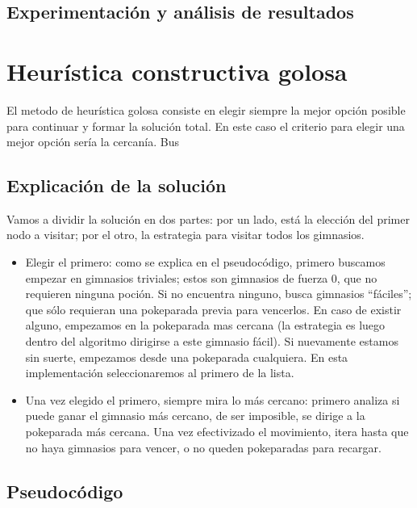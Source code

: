 \documentclass[spanish,12pt]{article}
\begin{document}
\subsection{Experimentación y análisis de resultados}



\section{Heurística constructiva golosa}

El metodo de heurística golosa consiste en elegir siempre la mejor opción posible para continuar y formar la solución total. En este caso el criterio para elegir una mejor opción sería la cercanía. Bus


\subsection{Explicación de la solución}
Vamos a dividir la solución en dos partes: por un lado, está la elección del primer nodo a visitar; por el otro, la estrategia para visitar todos los gimnasios.

\begin{itemize}
	\item Elegir el primero: como se explica en el pseudocódigo, primero buscamos empezar en gimnasios triviales; estos son gimnasios de fuerza 0, que no requieren ninguna poción. Si no encuentra ninguno, busca gimnasios ``fáciles''; que sólo requieran una pokeparada previa para vencerlos. En caso de existir alguno, empezamos en la pokeparada mas cercana (la estrategia es luego dentro del algoritmo dirigirse a este gimnasio fácil). Si nuevamente estamos sin suerte, empezamos desde una pokeparada cualquiera. En esta implementación seleccionaremos al primero de la lista.
	\item Una vez elegido el primero, siempre mira lo más cercano: primero analiza si puede ganar el gimnasio más cercano, de ser imposible, se dirige a la pokeparada más cercana. Una vez efectivizado el movimiento, itera hasta que no haya gimnasios para vencer, o no queden pokeparadas para recargar.
	
\end{itemize} 




\subsection{Pseudocódigo}
\end{document}
